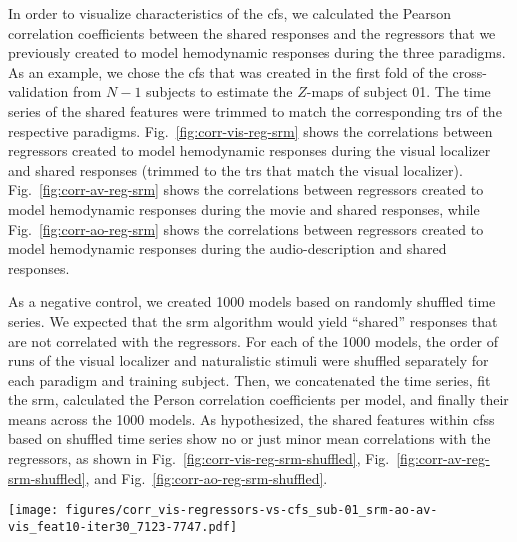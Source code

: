 In order to visualize characteristics of the \ac{cfs}, we calculated the Pearson
correlation coefficients between the shared responses and the regressors that we
previously created \citep[cf.][]{sengupta2016extension, haeusler2022processing}
to model hemodynamic responses during the three paradigms.
%
As an example, we chose the \ac{cfs} that was created in the first fold of the
cross-validation from $N-1$ subjects to estimate the $Z$-maps of subject 01.
%
The time series of the shared features were trimmed to match the corresponding
\acp{tr} of the respective paradigms.
%
Fig.~\ref{fig:corr-vis-reg-srm} shows the correlations between regressors
created to model hemodynamic responses during the visual localizer and shared
responses (trimmed to the \acp{tr} that match the visual localizer).
Fig.~\ref{fig:corr-av-reg-srm} shows the correlations between regressors created
to model hemodynamic responses during the movie \citep[cf. Table 3
in][]{haeusler2022processing} and shared responses, while
Fig.~\ref{fig:corr-ao-reg-srm} shows the correlations between regressors created
to model hemodynamic responses during the audio-description \citep[cf. Table 3
in][]{haeusler2022processing} and shared responses.



As a negative control, we created 1000 models based on randomly shuffled time
series.
%
We expected that the \ac{srm} algorithm would yield ``shared'' responses that
are not correlated with the regressors.
%
For each of the 1000 models, the order of runs of the visual localizer and
naturalistic stimuli were shuffled separately for each paradigm and training
subject.
%
Then, we concatenated the time series, fit the \ac{srm}, calculated the Person
correlation coefficients per model, and finally their means across the 1000
models.
%
As hypothesized, the shared features within \acp{cfs} based on shuffled time
series show no or just minor mean correlations with the regressors, as shown in
%
Fig.~\ref{fig:corr-vis-reg-srm-shuffled},
%
Fig.~\ref{fig:corr-av-reg-srm-shuffled}, and
%
Fig.~\ref{fig:corr-ao-reg-srm-shuffled}.


\begin{figure*}[tbp]
\centering
\texttt{[image: figures/corr\_vis-regressors-vs-cfs\_sub-01\_srm-ao-av-vis\_feat10-iter30\_7123-7747.pdf]}
\caption{
%
\textbf{Pearson correlation coefficients between regressors of the visual
localizer and shared features.}
%
The time series of the shared features within the multi-paradigm \ac{cfs}
%
(as calculated for subject 01 in the first fold of the cross-validation)
%
were trimmed to match the corresponding \acp{tr} of the visual localizer
paradigm \citep{sengupta2016extension}.
%
The six regressors of the visual localizer model hemodynamic responses to
the six categories of pictures that were presented in blocks.
}
\label{fig:corr-vis-reg-srm}
\end{figure*}


